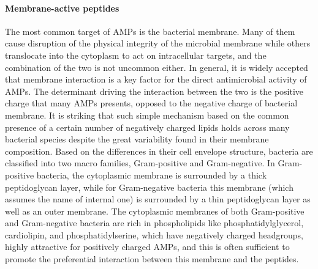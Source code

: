 \documentclass[a4paper,11pt]{extreport}
\begin{document}
\paragraph{Membrane-active peptides} The most common target of AMPs is the bacterial membrane. Many of them cause disruption of the physical integrity of the microbial membrane while others translocate into the cytoplasm to act on intracellular targets, and the combination of the two is not uncommon either.\cite{Hancock2006} In general, it is widely accepted that membrane interaction is a key factor for the direct antimicrobial activity of AMPs.\cite{Nguyen2011,Malmsten2016}
%
The determinant driving the interaction between the two is the positive charge that many AMPs presents, opposed to the negative charge of bacterial membrane.\cite{Zhang2001,Schmitt2016}
%
It is striking that such simple mechanism based on the common presence of a certain number of negatively charged lipids holds across many bacterial species despite the great variability found in their membrane composition.
%
Based on the differences in their cell envelope structure, bacteria are classified into two macro families, Gram-positive and Gram-negative. In Gram-positive bacteria, the cytoplasmic membrane is surrounded by a thick peptidoglycan layer, while for Gram-negative bacteria this membrane (which assumes the name of internal one) is surrounded by a thin peptidoglycan layer as well as an outer membrane.\cite{Lin2016}
%
The cytoplasmic membranes of both Gram-positive and Gram-negative bacteria are rich in phospholipids like phosphatidylglycerol, cardiolipin, and phosphatidylserine, which have negatively charged headgroups, highly attractive for positively charged AMPs, and this is often sufficient to promote the preferential interaction between this membrane and the peptides.
\end{document}
